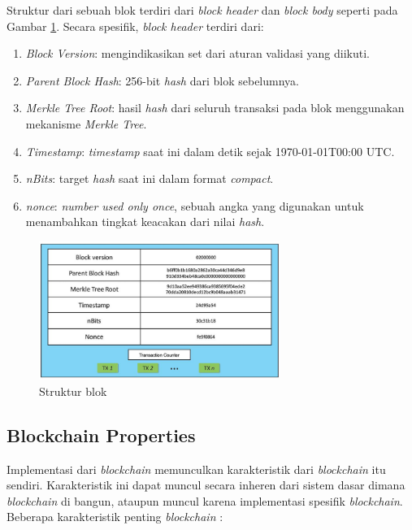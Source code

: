 \break

Struktur dari sebuah blok terdiri dari \textit{block header} dan \textit{block body} seperti pada Gambar \ref{image:struktur-blok}. Secara spesifik, \textit{block header} terdiri dari:

\begin{enumerate}
	\item \textit{Block Version}: mengindikasikan set dari aturan validasi yang diikuti.
	\item \textit{Parent Block Hash}: 256-bit \textit{hash} dari blok sebelumnya.
	\item \textit{Merkle Tree Root}: hasil \textit{hash} dari seluruh transaksi pada blok menggunakan mekanisme \textit{Merkle Tree}.
	\item \textit{Timestamp}: \textit{timestamp} saat ini dalam detik sejak 1970-01-01T00:00 UTC.
	\item \textit{nBits}: target \textit{hash} saat ini dalam format \textit{compact}.
	\item \textit{nonce}: \textit{number used only once}, sebuah angka yang digunakan untuk menambahkan tingkat keacakan dari nilai \textit{hash}.
\end{enumerate}

\begin{figure}
	\centering
	\includegraphics[width=0.7\textwidth]{resources/chapter-2/struktur-block.png}
	\caption{Struktur blok \parencite{zheng2018blockchain}}
	\label{image:struktur-blok}
\end{figure}

\subsection{Blockchain Properties}
\label{subsec:blockchain-properties}

Implementasi dari \textit{blockchain} memunculkan karakteristik dari \textit{blockchain} itu sendiri. Karakteristik ini dapat muncul secara inheren dari sistem dasar dimana \textit{blockchain} di bangun, ataupun muncul karena implementasi spesifik \textit{blockchain}. Beberapa karakteristik penting \textit{blockchain} \parencite{aimar2023extraction}:

